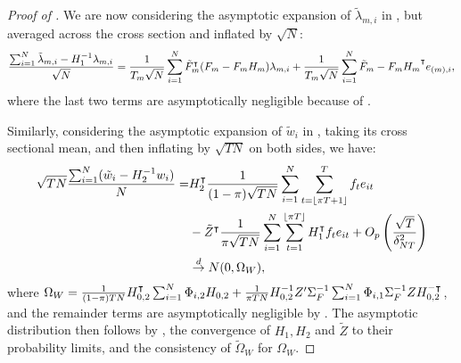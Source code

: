 \documentclass[12pt]{article}
\newcommand*{\tran}{\intercal}
\theoremstyle{plain}
\numberwithin{equation}{section}
\begin{document}
\begin{proof}[Proof of ]
We are now considering the asymptotic expansion of $\tilde{\lambda}_{m, i}$ in , but averaged across the cross section and inflated by $\sqrt{N}$:
\begin{align}
\label{lem:bai_inf:7:B.2_pool}
\frac{\sumN \tilde{\lambda}_{m, i} - H_1^{-1}\lambda_{m, i}}{\sqrt{N}} = \frac{1}{T_m \sqrt{N}} \sumN \tilde{F}_m^\tran (F_m - F_m H_m) \lambda_{m, i} + \frac{1}{T_m \sqrt{N}} \sumN {\tilde{F}_m - F_m H_m}^\tran e_{(m), i},
\end{align}
where the last two terms are asymptotically negligible because of .

Similarly, considering the asymptotic expansion of $\tilde{w}_i$ in , taking its cross sectional mean, and then inflating by $\sqrt{TN}$ on both sides, we have:
\begin{align*}
\sqrt{TN} \frac{\sumN (\tilde{w}_{i} - H_2^{-1} w_i)}{N} = &
H_{2}^\tran \frac{1}{(1 - \pi)\sqrt{TN}} \sumN \sumTfloort f_t e_{it} \\
&- 
\tilde{Z}^\tran \frac{1}{\pi \sqrt{TN}} \sumN \sumTfloor H_1^\tran f_t e_{it} +
\OprtTdeltasq \\
&\convd N(0, \Omega_W), \nonumber 
\end{align*}
where $\Omega_{W} = \frac{1}{(1 - \pi) TN} H_{0, 2}^\tran \sumN \Phi_{i, 2} H_{0, 2} + \frac{1}{\pi TN } H_{0, 2}^{-1} Z' \Sigma_F^{-1} \sumN \Phi_{i, 1} \Sigma_F^{-1} Z H_{0, 2}^{- \tran}$,
and the remainder terms are asymptotically negligible by . The asymptotic distribution then follows by , the convergence of $H_1, H_2$ and $\tilde{Z}$ to their probability limits, and the consistency of $\tilde{\Omega}_{W}$ for $\Omega_W$.
\end{proof}

%
\end{document}
